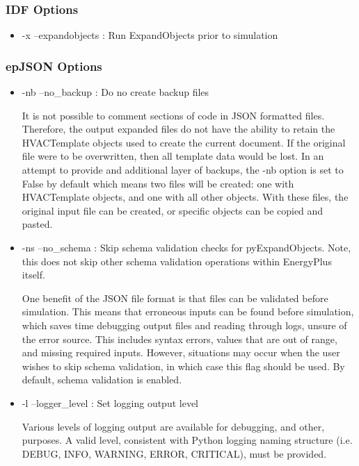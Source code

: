 \subsubsection*{IDF Options}

\begin{itemize}
\item
  -x --expandobjects : Run ExpandObjects prior to simulation
\end{itemize}

\subsubsection*{epJSON Options}\label{pyexpandobjects-cli-epjson-options}

\begin{itemize}
\item
  -nb --no\_backup : Do no create backup files
  
  It is not possible to comment sections of code in JSON formatted files.  Therefore, the output expanded files do not have the ability to retain the HVACTemplate objects used to create the current document.  If the original file were to be overwritten, then all template data would be lost.  In an attempt to provide and additional layer of backups, the -nb option is set to False by default which means two files will be created: one with HVACTemplate objects, and one with all other objects.  With these files, the original input file can be created, or specific objects can be copied and pasted.
\item
  -ns --no\_schema : Skip schema validation checks for pyExpandObjects.  Note, this does not skip other schema validation operations within EnergyPlus itself.
  
  One benefit of the JSON file format is that files can be validated before simulation.  This means that erroneous inputs can be found before simulation, which saves time debugging output files and reading through logs, unsure of the error source.  This includes syntax errors, values that are out of range, and missing required inputs.  However, situations may occur when the user wishes to skip schema validation, in which case this flag should be used.  By default, schema validation is enabled.
  
\item
  -l --logger\_level : Set logging output level 
  
  Various levels of logging output are available for debugging, and other, purposes.  A valid level, consistent with Python logging naming structure (i.e. DEBUG, INFO, WARNING, ERROR, CRITICAL), must be provided.

\end{itemize}

